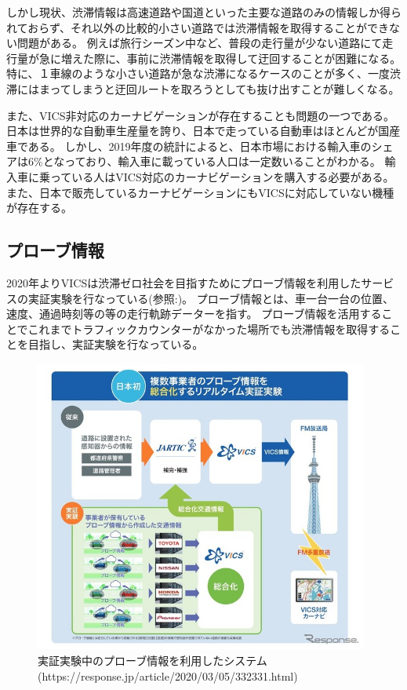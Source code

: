 しかし現状、渋滞情報は高速道路や国道といった主要な道路のみの情報しか得られておらず、それ以外の比較的小さい道路では渋滞情報を取得することができない問題がある。
例えば旅行シーズン中など、普段の走行量が少ない道路にて走行量が急に増えた際に、事前に渋滞情報を取得して迂回することが困難になる。
特に、１車線のような小さい道路が急な渋滞になるケースのことが多く、一度渋滞にはまってしまうと迂回ルートを取ろうとしても抜け出すことが難しくなる。

また、VICS非対応のカーナビゲーションが存在することも問題の一つである。
日本は世界的な自動車生産量を誇り、日本で走っている自動車はほとんどが国産車である。
しかし、2019年度の統計によると、日本市場における輸入車のシェアは6\%となっており、輸入車に載っている人口は一定数いることがわかる。
輸入車に乗っている人はVICS対応のカーナビゲーションを購入する必要がある。
また、日本で販売しているカーナビゲーションにもVICSに対応していない機種が存在する。

\subsection{プローブ情報}
2020年よりVICSは渋滞ゼロ社会を目指すためにプローブ情報を利用したサービスの実証実験を行なっている(参照:)。
プローブ情報とは、車一台一台の位置、速度、通過時刻等の等の走行軌跡データーを指す。
プローブ情報を活用することでこれまでトラフィックカウンターがなかった場所でも渋滞情報を取得することを目指し、実証実験を行なっている。

\begin{figure}[htbp]
  \begin{center}
   \includegraphics[width=11cm]{figs/probe.jpg}
  \end{center}
  \caption{実証実験中のプローブ情報を利用したシステム(https://response.jp/article/2020/03/05/332331.html)}
  \label{fig:probe}
\end{figure}

